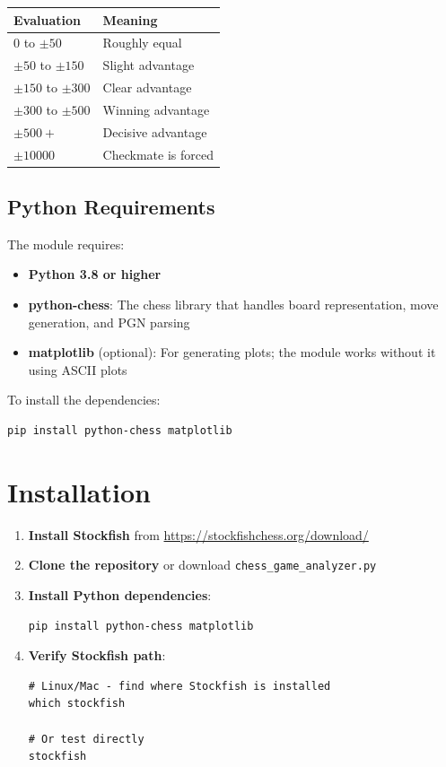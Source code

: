 \documentclass[12pt]{book}
\begin{document}
\begin{center}
\begin{tabular}{ll}
\toprule
\textbf{Evaluation} & \textbf{Meaning} \\
\midrule
$0$ to $\pm 50$ & Roughly equal \\
$\pm 50$ to $\pm 150$ & Slight advantage \\
$\pm 150$ to $\pm 300$ & Clear advantage \\
$\pm 300$ to $\pm 500$ & Winning advantage \\
$\pm 500+$ & Decisive advantage \\
$\pm 10000$ & Checkmate is forced \\
\bottomrule
\end{tabular}
\end{center}

\subsection{Python Requirements}

The module requires:
\begin{itemize}
    \item \textbf{Python 3.8 or higher}
    \item \textbf{python-chess}: The chess library that handles board representation, move generation, and PGN parsing
    \item \textbf{matplotlib} (optional): For generating plots; the module works without it using ASCII plots
\end{itemize}

To install the dependencies:
\begin{verbatim}
pip install python-chess matplotlib
\end{verbatim}

\section{Installation}

\begin{enumerate}
    \item \textbf{Install Stockfish} from \url{https://stockfishchess.org/download/}
    
    \item \textbf{Clone the repository} or download \texttt{chess\_game\_analyzer.py}
    
    \item \textbf{Install Python dependencies}:
\begin{verbatim}
pip install python-chess matplotlib
\end{verbatim}
    
    \item \textbf{Verify Stockfish path}:
\begin{verbatim}
# Linux/Mac - find where Stockfish is installed
which stockfish

# Or test directly
stockfish
\end{verbatim}
\end{enumerate}
\end{document}
